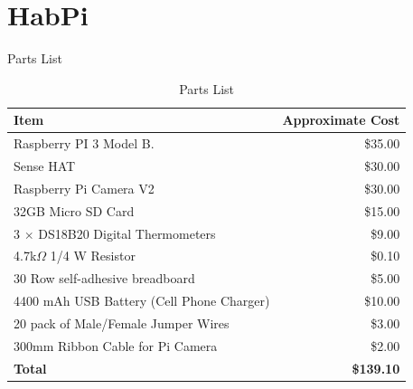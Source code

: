 \documentclass[handout]{beamer}
\begin{document}
\section{HabPi}

\begin{frame}{Parts List}
\begin{table}
    \begin{center}
    \begin{tabular}{l|r}
        {\bf Item} & {\bf Approximate Cost}\\
        \hline
        Raspberry PI 3 Model B. & \$35.00\\
        Sense HAT & \$30.00\\
        Raspberry Pi Camera V2& \$30.00\\
        32GB Micro SD Card & \$15.00\\
        3 $\times$ DS18B20 Digital Thermometers & \$9.00\\
        4.7k$\Omega$ 1/4 W Resistor & \$0.10\\
        30 Row self-adhesive breadboard & \$5.00\\
        4400 mAh USB Battery (Cell Phone Charger) & \$10.00\\ 
        20 pack of Male/Female Jumper Wires & \$3.00\\
        300mm Ribbon Cable for Pi Camera & \$2.00\\
        \hline
        {\bf Total} & {\bf\$139.10} \\
    \end{tabular}
    \caption{Parts List}
    \label{tab:parts}
    \end{center}
\end{table}
\end{frame}
\end{document}
